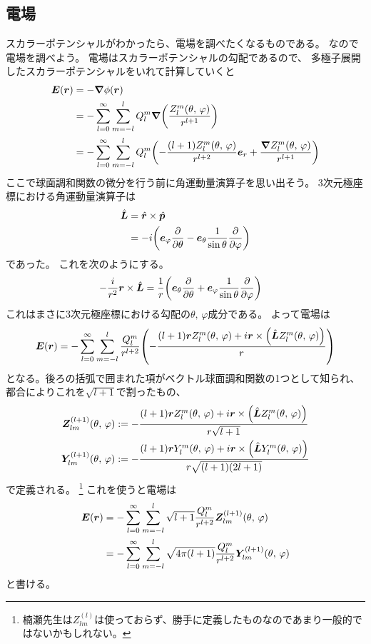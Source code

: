 \documentclass[../../master.tex]{subfiles}
\begin{document}
\subsection{電場}
スカラーポテンシャルがわかったら、電場を調べたくなるものである。
なので電場を調べよう。
電場はスカラーポテンシャルの勾配であるので、
多極子展開したスカラーポテンシャルをいれて計算していくと
\begin{align}
    \vb*{E}(\vb*{r}) &= -\grad \phi(\vb*{r})\\
    &= -\sum_{l=0}^{\infty} \sum_{m=-l}^{l} Q_l^m \grad\qty(\frac{Z_l^m(\theta,\,\varphi)}{r^{l+1}})\\
    &= -\sum_{l=0}^{\infty} \sum_{m=-l}^{l} Q_l^m \qty(-\frac{(l+1)Z_l^m(\theta,\,\varphi)}{r^{l+2}}\vb*{e}_r+\frac{\grad Z_l^m(\theta,\,\varphi)}{r^{l+1}})\\
\end{align}
ここで球面調和関数の微分を行う前に角運動量演算子を思い出そう。
3次元極座標における角運動量演算子は
\begin{align}
    \hat{\vb*{L}} &= \hat{\vb*{r}} \times \hat{\vb*{p}}\\
    &= -i\qty(\vb*{e}_\varphi \pdv{\theta} -\vb*{e}_\theta \frac{1}{\sin\theta}\pdv{\varphi})
\end{align}
であった。
これを次のようにする。
\begin{align}
    -\frac{i}{r^2}\vb*{r} \times \hat{\vb*{L}} &= \frac{1}{r}\qty(\vb*{e}_\theta \pdv{\theta} +\vb*{e}_\varphi \frac{1}{\sin\theta}\pdv{\varphi})
\end{align}
これはまさに3次元極座標における勾配の\(\theta,\,\varphi\)成分である。
よって電場は
\begin{equation}
    \vb*{E}(\vb*{r}) = -\sum_{l=0}^{\infty} \sum_{m=-l}^{l}\frac{Q_l^m}{r^{l+2}}
    \qty(-\frac{(l+1)\vb*{r}Z_l^m(\theta,\,\varphi)+i\vb*{r}\times\qty(\hat{\vb*{L}}Z_l^m(\theta,\,\varphi))}{r})
\end{equation}
となる。後ろの括弧で囲まれた項がベクトル球面調和関数の1つとして知られ、
都合によりこれを\(\sqrt{l+1}\)で割ったもの、
\begin{align}
    \vb*{Z}_{lm}^{(l+1)}(\theta,\,\varphi) &:=-\frac{(l+1)\vb*{r}Z_l^m(\theta,\,\varphi)+i\vb*{r}\times\qty(\hat{\vb*{L}}Z_l^m(\theta,\,\varphi))}{r\sqrt{l+1}}\\
    \vb*{Y}_{lm}^{(l+1)}(\theta,\,\varphi) &:=-\frac{(l+1)\vb*{r}Y_l^m(\theta,\,\varphi)+i\vb*{r}\times\qty(\hat{\vb*{L}}Y_l^m(\theta,\,\varphi))}{r\sqrt{(l+1)(2l+1)}}\\
\end{align}
で定義される。
\footnote{楠瀬先生は\(Z_{lm}^{(l)}\)は使っておらず、勝手に定義したものなのであまり一般的ではないかもしれない。}
これを使うと電場は
\begin{align}
    \vb*{E}(\vb*{r})
    &= -\sum_{l=0}^{\infty} \sum_{m=-l}^{l}\sqrt{l+1}\frac{Q_l^m}{r^{l+2}} \vb*{Z}_{lm}^{(l+1)}(\theta,\,\varphi)\\
    &= -\sum_{l=0}^{\infty} \sum_{m=-l}^{l}\sqrt{4\pi(l+1)}\frac{Q_l^m}{r^{l+2}} \vb*{Y}_{lm}^{(l+1)}(\theta,\,\varphi)\\
\end{align}
と書ける。
\end{document}

